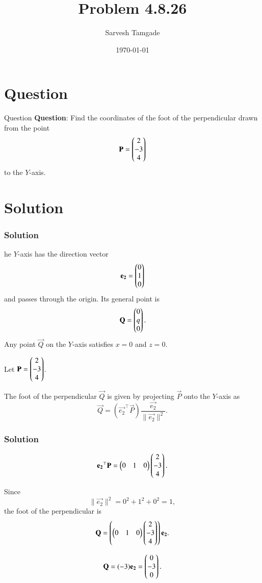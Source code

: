 \documentclass{beamer}
\title{Problem 4.8.26}
\author{Sarvesh Tamgade}
\date{\today}
\numberwithin{equation}{section}
\begin{document}
\begin{frame}
\titlepage
\end{frame}

\section{Question}
\begin{frame}{Question}
\textbf{Question}:
Find the coordinates of the foot of the perpendicular drawn from the point
\[
\mathbf{P} = \begin{pmatrix}2 \\ -3 \\ 4\end{pmatrix}
\]
to the \(Y\)-axis.
\end{frame}

\section{Solution}
\begin{frame}[fragile]
    \frametitle{Solution}
he \(Y\)-axis has the direction vector
\[
\mathbf{e_{2}} = \begin{pmatrix}0 \\ 1 \\ 0\end{pmatrix}
\]
and passes through the origin. Its general point is
\[
\mathbf{Q} = \begin{pmatrix}0 \\ q \\ 0\end{pmatrix}.
\]
Any point \(\vec{Q}\) on the \(Y\)-axis satisfies \(x = 0\) and \(z = 0\).

Let \(\mathbf{P} = \begin{pmatrix}2 \\ -3 \\ 4\end{pmatrix}\).

The foot of the perpendicular \(\vec{Q}\) is given by projecting \(\vec{P}\) onto the \(Y\)-axis as
\[
\vec{Q} = \left(\vec{e_{2}}^\top \vec{P}\right) \frac{\vec{e_{2}}}{\|\vec{e_{2}}\|^2}.
\]
\end{frame}
\begin{frame}[fragile]
    \frametitle{Solution}


\[
\mathbf{e_{2}}^\top \mathbf{P} = \begin{pmatrix}0 & 1 & 0\end{pmatrix} \begin{pmatrix}2 \\ -3 \\ 4\end{pmatrix}.
\]

Since 
\[
\|\vec{e_{2}}\|^2 = 0^2 + 1^2 + 0^2 = 1,
\]
the foot of the perpendicular is
\[
\mathbf{Q} = \left( \begin{pmatrix}0 & 1 & 0\end{pmatrix} \begin{pmatrix}2 \\ -3 \\ 4\end{pmatrix} \right) \mathbf{e_{2}}.
\]

\[
\mathbf{Q} = (-3) \mathbf{e_{2}} = \begin{pmatrix}0 \\ -3 \\ 0\end{pmatrix}.
\]

\end{frame}
\end{document}
